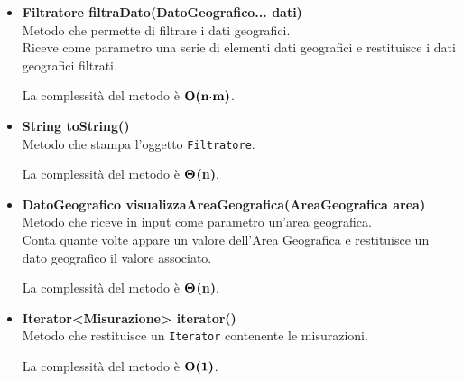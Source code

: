 \documentclass[a4paper, 12pt]{scrreprt}
\begin{document}
\begin{itemize}
				La complessit\`a del metodo \`e $\bigO\textbf{(n$\cdot$m)}$.
				
				\item \textbf {Filtratore filtraDato(DatoGeografico... dati)}
				\\Metodo che permette di filtrare i dati geografici.
				\\Riceve come parametro una serie di elementi dati geografici e restituisce i dati geografici filtrati.
				
				La complessit\`a del metodo \`e $\bigO\textbf{(n$\cdot$m)}$.
				
				\item \textbf {String toString()}
				\\Metodo che stampa l'oggetto \verb!Filtratore!.
				
				La complessit\`a del metodo \`e $\mathbf{\Theta}$\textbf{(n)}.
				
				\item \textbf{DatoGeografico visualizzaAreaGeografica(AreaGeografica area)}
				\\Metodo che riceve in input come parametro un'area geografica.
				\\Conta quante volte appare un valore dell'Area Geografica e restituisce un dato geografico il valore associato.
				
				La complessit\`a del metodo \`e $\mathbf{\Theta}$\textbf{(n)}.
				
				\item \textbf{Iterator<Misurazione> iterator()}
				\\Metodo che restituisce un \verb!Iterator! contenente le misurazioni.
				
				La complessit\`a del metodo \`e $\mathbf{O}\textbf{(1)}$.
				
			\end{itemize}
\end{document}
